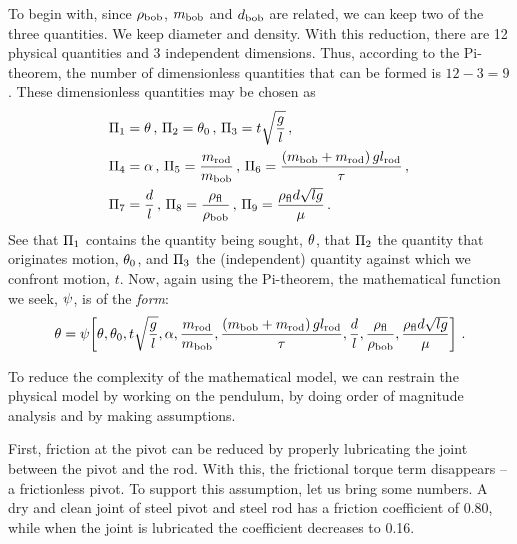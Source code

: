 To begin with, since $\rho_\text{bob}$, $m_\text{bob}$ and $d_\text{bob}$ are related, we can keep two of the three quantities. We keep diameter and density. With this reduction, there are 12 physical quantities and 3 independent dimensions. Thus, according to the Pi-theorem, the number of dimensionless quantities that can be formed is $12 - 3 = 9$. These dimensionless quantities may be chosen as
\begin{align*}
&\Pi_1 = \theta\,,\,
 \Pi_2 = \theta_0\,,\,
 \Pi_3 = t\sqrt{\dfrac{g}{l}}\,,\,\\
&\Pi_4 = \alpha\,,\,
 \Pi_5 = \dfrac{m_\text{rod}}{m_\text{bob}}\,,\,
 \Pi_6 = \dfrac{\left(m_\text{bob} + m_\text{rod}\right)gl_\text{rod}}{\tau}\,,\,\\
&\Pi_7 = \dfrac{d}{l}\,,\,
 \Pi_8 = \dfrac{\rho_\text{fl}}{\rho_\text{bob}}\,,\,
 \Pi_9 = \dfrac{\rho_\text{fl}d\sqrt{lg}}{\mu}\,.
\end{align*}
See that $\Pi_1$ contains the quantity being sought, $\theta$, that $\Pi_2$ the quantity that originates motion, $\theta_0$, and $\Pi_3$ the (independent) quantity against which we confront motion, $t$. Now, again using the Pi-theorem, the mathematical function we seek, $\psi$, is of the \emph{form}:
\begin{equation}\label{eq:fullgravpendulummodel}
\theta = \psi\!\left[{
            \theta,
            \theta_0,
            t\sqrt{\dfrac{g}{l}},
            \alpha,
            \dfrac{m_\text{rod}}{m_\text{bob}},
            \dfrac{\left(m_\text{bob} + m_\text{rod}\right)gl_\text{rod}}{\tau},
            \dfrac{d}{l},
            \dfrac{\rho_\text{fl}}{\rho_\text{bob}},
            \dfrac{\rho_\text{fl}d\sqrt{lg}}{\mu}
            }\right]\,.
\end{equation}

To reduce the complexity of the mathematical model, we can restrain the physical model by working on the pendulum, by doing order of magnitude analysis and by making assumptions.

First, friction at the pivot can be reduced by properly lubricating the joint between the pivot and the rod. With this, the frictional torque term disappears -- a frictionless pivot. To support this assumption, let us bring some numbers. A dry and clean joint of steel pivot and steel rod has a friction coefficient of 0.80, while when the joint is lubricated the coefficient decreases to 0.16.

